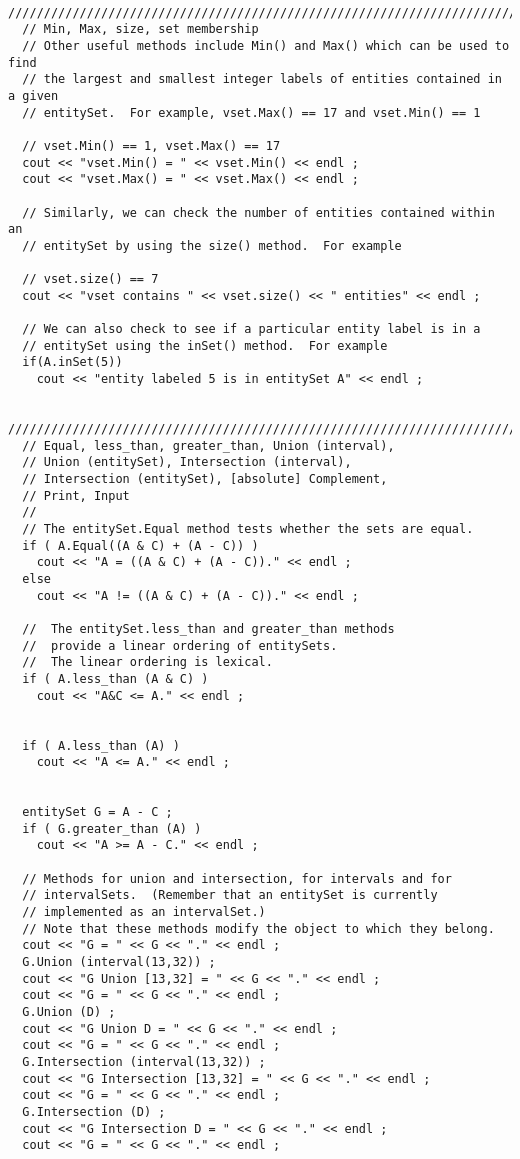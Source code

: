 \begin{verbatim}
  ////////////////////////////////////////////////////////////////////////////
  // Min, Max, size, set membership
  // Other useful methods include Min() and Max() which can be used to find
  // the largest and smallest integer labels of entities contained in a given
  // entitySet.  For example, vset.Max() == 17 and vset.Min() == 1

  // vset.Min() == 1, vset.Max() == 17
  cout << "vset.Min() = " << vset.Min() << endl ;
  cout << "vset.Max() = " << vset.Max() << endl ;

  // Similarly, we can check the number of entities contained within an
  // entitySet by using the size() method.  For example

  // vset.size() == 7
  cout << "vset contains " << vset.size() << " entities" << endl ;

  // We can also check to see if a particular entity label is in a
  // entitySet using the inSet() method.  For example
  if(A.inSet(5))
    cout << "entity labeled 5 is in entitySet A" << endl ;

  ////////////////////////////////////////////////////////////////////////////
  // Equal, less_than, greater_than, Union (interval), 
  // Union (entitySet), Intersection (interval), 
  // Intersection (entitySet), [absolute] Complement, 
  // Print, Input
  //
  // The entitySet.Equal method tests whether the sets are equal.
  if ( A.Equal((A & C) + (A - C)) )
    cout << "A = ((A & C) + (A - C))." << endl ;
  else
    cout << "A != ((A & C) + (A - C))." << endl ;

  //  The entitySet.less_than and greater_than methods 
  //  provide a linear ordering of entitySets.
  //  The linear ordering is lexical.
  if ( A.less_than (A & C) )
    cout << "A&C <= A." << endl ;


  if ( A.less_than (A) )
    cout << "A <= A." << endl ;


  entitySet G = A - C ;
  if ( G.greater_than (A) )
    cout << "A >= A - C." << endl ;

  // Methods for union and intersection, for intervals and for
  // intervalSets.  (Remember that an entitySet is currently
  // implemented as an intervalSet.) 
  // Note that these methods modify the object to which they belong.  
  cout << "G = " << G << "." << endl ;
  G.Union (interval(13,32)) ;
  cout << "G Union [13,32] = " << G << "." << endl ;
  cout << "G = " << G << "." << endl ;
  G.Union (D) ;
  cout << "G Union D = " << G << "." << endl ;
  cout << "G = " << G << "." << endl ;
  G.Intersection (interval(13,32)) ;
  cout << "G Intersection [13,32] = " << G << "." << endl ;
  cout << "G = " << G << "." << endl ;
  G.Intersection (D) ;
  cout << "G Intersection D = " << G << "." << endl ;
  cout << "G = " << G << "." << endl ; 


\end{verbatim}
